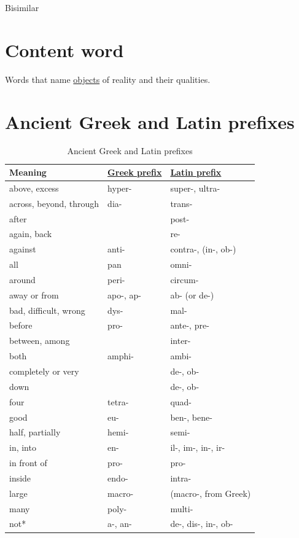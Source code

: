 \documentclass[a4paper,14pt,oneside]{book}
\begin{document}
\label{org84dc762}Bisimilar

\section{\label{orge5a971c}Content word}
\label{sec:orgdd2def2}
Words that name \hyperref[orgb826f5c]{objects} of reality and their qualities.

\section{Ancient Greek and Latin prefixes}
\label{sec:orgc2f9f6e}
\begin{table}[htbp]
\caption{\label{tab--ancient-greek-latin-prefixes}Ancient Greek and Latin prefixes}
\centering
\begin{tabu} spread \linewidth {lll}
\toprule
Meaning & \hyperref[org7c7c025]{Greek prefix} & \hyperref[org497b28c]{Latin prefix}\\
\midrule
above, excess & hyper- & super-, ultra-\\
across, beyond, through & dia- & trans-\\
after &  & post-\\
again, back &  & re-\\
against & anti- & contra-, (in-, ob-)\\
all & pan & omni-\\
around & peri- & circum-\\
away or from & apo-, ap- & ab- (or de-)\\
bad, difficult, wrong & dys- & mal-\\
before & pro- & ante-, pre-\\
between, among &  & inter-\\
both & amphi- & ambi-\\
completely or very &  & de-, ob-\\
down &  & de-, ob-\\
four & tetra- & quad-\\
good & eu- & ben-, bene-\\
half, partially & hemi- & semi-\\
in, into & en- & il-, im-, in-, ir-\\
in front of & pro- & pro-\\
inside & endo- & intra-\\
large & macro- & (macro-, from Greek)\\
many & poly- & multi-\\
not* & a-, an- & de-, dis-, in-, ob-\\

\end{tabu}
\end{table}
\end{document}

